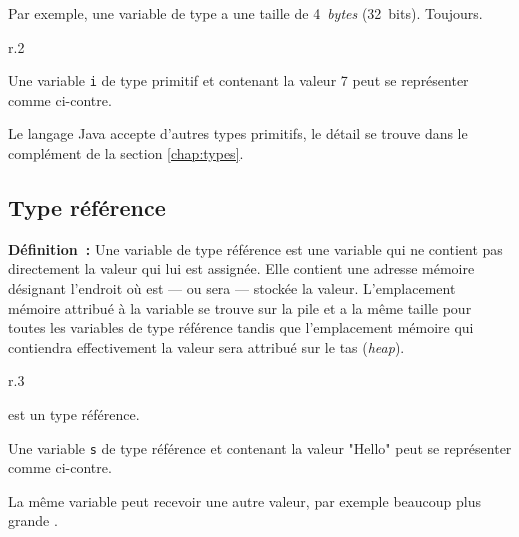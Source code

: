 	Par exemple, une variable de type  a une taille de
	4~\textit{bytes} (32~bits). Toujours.
	
	\begin{wrapfigure}{r}{.2\linewidth}
	\end{wrapfigure}

	Une variable \texttt{i} de type primitif et contenant la valeur 7 peut se
	représenter comme ci-contre. 

	Le langage Java accepte d'autres types primitifs, le détail se trouve dans le
	complément de la section \vref{chap:types}.
		
	
	\subsection{Type référence}
	
	\textbf{Définition~:} 
	Une variable de type référence est une variable qui ne contient pas
	directement la valeur qui lui est assignée. Elle contient une adresse
	mémoire désignant l'endroit où est — ou sera — stockée la valeur.
	L'emplacement mémoire attribué à la variable se trouve sur la pile et a la
	même taille pour toutes les variables de type référence tandis que
	l'emplacement mémoire qui contiendra effectivement la valeur sera attribué
	sur le tas (\textit{heap}).


	\begin{wrapfigure}{r}{.3\linewidth}
		\begin{center}
		\end{center}
	\end{wrapfigure}
	
	 est un type référence. 

	Une variable \texttt{s} de type référence et contenant la valeur "Hello" 
	peut se représenter comme ci-contre. 

	La même variable  peut recevoir une autre valeur, par exemple beaucoup
	plus grande . 

